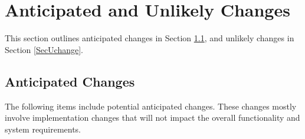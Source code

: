 \documentclass[12pt, titlepage]{article}
\begin{document}


\section{Anticipated and Unlikely Changes} \label{SecChange}

This section outlines anticipated changes in Section \ref{SecAchange}, and
unlikely changes in Section \ref{SecUchange}.

\subsection{Anticipated Changes} \label{SecAchange}

The following items include potential anticipated changes. These changes mostly involve implementation changes that will not impact the overall functionality and system requirements.
\end{document}
